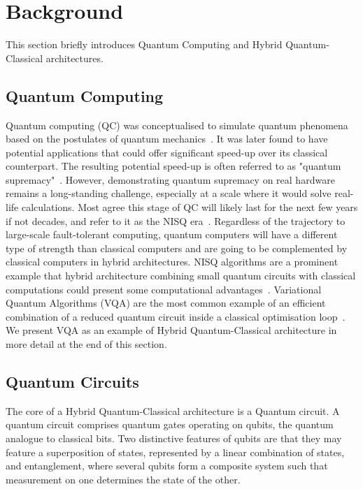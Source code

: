\section{Background}
\label{background}

This section briefly introduces Quantum Computing and Hybrid Quantum-Classical architectures.

\subsection{Quantum Computing}
Quantum computing (QC) was conceptualised to simulate quantum phenomena based on the postulates of quantum mechanics~\cite{feynman_simulating_1982}. It was later found to have potential applications that could offer significant speed-up over its classical counterpart. The resulting potential speed-up is often referred to as "quantum supremacy"~\cite{arute_quantum_2019}. However, demonstrating quantum supremacy on real hardware remains a long-standing challenge, especially at a scale where it would solve real-life calculations. Most agree this stage of QC will likely last for the next few years if not decades, and refer to it as the NISQ era~\cite{preskill_quantum_2018}. Regardless of the trajectory to large-scale fault-tolerant computing, quantum computers will have a different type of strength than classical computers and are going to be complemented by classical computers in hybrid architectures. 
 NISQ algorithms are a prominent example that hybrid architecture combining small quantum circuits with classical computations could present some computational advantages~\cite{lau_nisq_2022}. Variational Quantum Algorithms (VQA) are the most common example of an efficient combination of a reduced quantum circuit inside a classical optimisation loop~\cite{tilly_variational_2022}. We present VQA as an example of Hybrid Quantum-Classical architecture in more detail at the end of this section.\\

\subsection{Quantum Circuits}

The core of a Hybrid Quantum-Classical architecture is a Quantum circuit. A quantum circuit comprises quantum gates operating on qubits, the quantum analogue to classical bits.  Two distinctive features of qubits are that they may feature a superposition of states,  represented by a linear combination of states, and entanglement, where several qubits form a composite system such that measurement on one determines the state of the other. 


